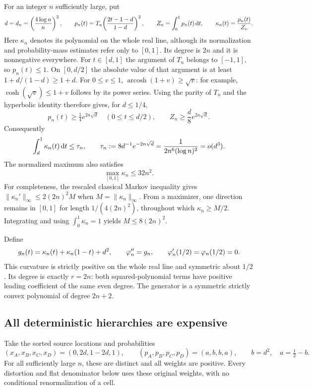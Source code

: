 For an integer $n$ sufficiently large, put
\begin{equation}
 d=d_n=\left(\frac{4\log n}{n}\right)^2,\qquad
 p_n(t)=T_n\!\left(\frac{2t-1-d}{1-d}\right)^2,\qquad
 Z_n=\int_0^1p_n(t)\,\mathrm d t,\qquad
 \kappa_n(t)=\frac{p_n(t)}{Z_n}.
 \label{eq:ext-endpointneedle}
\end{equation}
Here $\kappa_n$ denotes its polynomial on the whole real line, although its
normalization and probability-mass estimates refer only to $[0,1]$.
Its degree is $2n$ and it is nonnegative everywhere. For $t\in[d,1]$ the
argument of $T_n$ belongs to $[-1,1]$, so $p_n(t)\le1$. On $[0,d/2]$ the
absolute value of that argument is at least $1+d/(1-d)\ge1+d$.
For $0\le v\le1$, $\operatorname{arcosh}(1+v)\ge\sqrt v$: for example,
$\cosh(\sqrt v)\le1+v$ follows by its power series. Using the parity of
$T_n$ and the hyperbolic identity therefore gives, for $d\le1/4$,
\[
 p_n(t)\ge\tfrac14e^{2n\sqrt d}\quad(0\le t\le d/2),\qquad
 Z_n\ge\frac d8 e^{2n\sqrt d}.
\]
Consequently
\begin{equation}
 \int_d^1\kappa_n(t)\,\mathrm d t\le\tau_n,
 \qquad
 \tau_n:=8d^{-1}e^{-2n\sqrt d}
       =\frac{1}{2n^6(\log n)^2}=o(d^3).
 \label{eq:ext-tail}
\end{equation}
The normalized maximum also satisfies
\begin{equation}
 \max_{[0,1]}\kappa_n\le32n^2.
 \label{eq:ext-max}
\end{equation}
For completeness, the rescaled classical Markov inequality
\cite{shadrin} gives $\|\kappa_n'\|_\infty\le2(2n)^2M$ when
$M=\|\kappa_n\|_\infty$. From a maximizer, one direction remains in $[0,1]$
for length $1/(4(2n)^2)$, throughout which $\kappa_n\ge M/2$.
Integrating and using $\int_0^1\kappa_n=1$ yields $M\le8(2n)^2$.

Define
\begin{equation}
 g_n(t)=\kappa_n(t)+\kappa_n(1-t)+d^2,
 \qquad \varphi_n''=g_n,
 \qquad \varphi_n'(1/2)=\varphi_n(1/2)=0.
 \label{eq:ext-curvature}
\end{equation}
This curvature is strictly positive on the whole real line and symmetric
about $1/2$. Its degree is exactly $r=2n$: both squared-polynomial terms
have positive leading coefficient of the same even degree. The generator
is a symmetric strictly convex polynomial of degree $2n+2$.

\subsection{All deterministic hierarchies are expensive}
Take the sorted source locations and probabilities
\begin{equation}
 (x_A,x_B,x_C,x_D)=(0,2d,1-2d,1),\qquad
 (p_A,p_B,p_C,p_D)=(a,b,b,a),\qquad
 b=d^2,\quad a=\tfrac12-b.
 \label{eq:ext-source}
\end{equation}
For all sufficiently large $n$, these are distinct and all weights are
positive. Every distortion and flat denominator below uses these original
weights, with no conditional renormalization of a cell.

